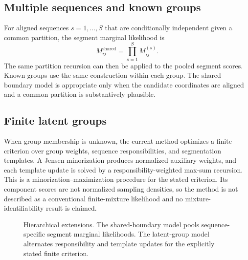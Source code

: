 \subsection{Multiple sequences and known groups}

For aligned sequences $s=1,\ldots,S$ that are conditionally independent given a common partition, the segment marginal likelihood is
\[
  M^{\mathrm{shared}}_{ij}=\prod_{s=1}^{S}M^{(s)}_{ij}.
\]
The same partition recursion can then be applied to the pooled segment scores. Known groups use the same construction within each group. The shared-boundary model is appropriate only when the candidate coordinates are aligned and a common partition is substantively plausible.

\subsection{Finite latent groups}

When group membership is unknown, the current method optimizes a finite criterion over group weights, sequence responsibilities, and segmentation templates. A Jensen minorization produces normalized auxiliary weights, and each template update is solved by a responsibility-weighted max-sum recursion. This is a minorization--maximization procedure for the stated criterion. Its component scores are not normalized sampling densities, so the method is not described as a conventional finite-mixture likelihood and no mixture-identifiability result is claimed.

\begin{figure}[H]
  \centering
  \resizebox{0.72\textwidth}{!}{}
  \caption*{(a) Common partition across conditionally independent sequences.}
  \vspace{7pt}
  \resizebox{0.94\textwidth}{!}{}
  \caption*{(b) Finite latent-group allocation and template updates.}
  \caption{Hierarchical extensions. The shared-boundary model pools sequence-specific segment marginal likelihoods. The latent-group model alternates responsibility and template updates for the explicitly stated finite criterion.}
  \label{fig:exec-hierarchy}
\end{figure}
